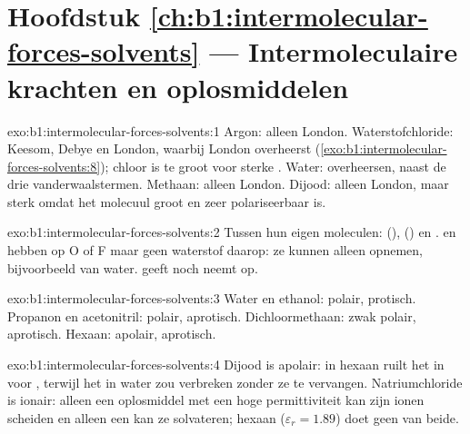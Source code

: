 \section*{Hoofdstuk \ref{ch:b1:intermolecular-forces-solvents} --- Intermoleculaire krachten en oplosmiddelen}

\begin{solution}{exo:b1:intermolecular-forces-solvents:1}
Argon: alleen London. Waterstofchloride: Keesom, Debye en London, waarbij
London overheerst (\cref{exo:b1:intermolecular-forces-solvents:8});
chloor is te groot voor sterke . Water: 
overheersen, naast de drie vanderwaalstermen. Methaan: alleen London.
Dijood: alleen London, maar sterk omdat het molecuul groot en zeer
polariseerbaar is.
\end{solution}

\begin{solution}{exo:b1:intermolecular-forces-solvents:2}
Tussen hun eigen moleculen:  (), 
() en .  en  hebben  op O
of F maar geen waterstof daarop: ze kunnen alleen 
opnemen, bijvoorbeeld van water.  geeft noch neemt op.
\end{solution}

\begin{solution}{exo:b1:intermolecular-forces-solvents:3}
Water en ethanol: polair, protisch. Propanon en acetonitril: polair,
aprotisch. Dichloormethaan: zwak polair, aprotisch. Hexaan: apolair,
aprotisch.
\end{solution}

\begin{solution}{exo:b1:intermolecular-forces-solvents:4}
Dijood is apolair: in hexaan ruilt het  in voor
, terwijl het in water  zou verbreken
zonder ze te vervangen. Natriumchloride is ionair: alleen een
oplosmiddel met een hoge permittiviteit kan zijn ionen scheiden en
alleen een  kan ze solvateren; hexaan
($\varepsilon_r = 1.89$) doet geen van beide.
\end{solution}

